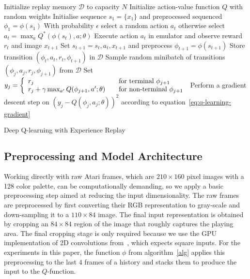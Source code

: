\documentclass{article} \usepackage{nips13submit_e,times}
\begin{document}
\begin{algorithm}[t]
\begin{algorithmic}
\State Initialize replay memory $\mathcal{D}$ to capacity $N$
\State Initialize action-value function $Q$ with random weights
\State Initialise sequence $s_1 = \{x_1\}$ and preprocessed sequenced $\phi_1 = \phi(s_1)$
	\State With probability $\epsilon$ select a random action $a_t$
	\State otherwise select $a_t = \max_{a} Q^*(\phi(s_t), a; \theta)$
	\State Execute action $a_t$ in emulator and observe reward $r_t$ and image $x_{t+1}$
	\State Set $s_{t+1} = s_t,a_t,x_{t+1}$ and preprocess $\phi_{t+1} = \phi(s_{t+1})$
	\State Store transition $\left(\phi_t,a_t,r_t,\phi_{t+1}\right)$ in $\mathcal{D}$
\State Sample random minibatch of transitions $\left(\phi_j,a_j,r_j,\phi_{j+1}\right)$ from $\mathcal{D}$
	\State Set
	$y_j =
    \left\{
    \begin{array}{l l}
      r_j  \quad & \text{for terminal } \phi_{j+1}\\
      r_j + \gamma \max_{a'} Q(\phi_{j+1}, a'; \theta) \quad & \text{for non-terminal } \phi_{j+1}
    \end{array} \right.$
	\State Perform a gradient descent step on $\left(y_j - Q(\phi_j, a_j; \theta) \right)^2$ according to equation~\ref{eq:q-learning-gradient}
\EndFor
\EndFor
\end{algorithmic}
\caption{Deep Q-learning with Experience Replay}
\label{alg}
\end{algorithm}











\subsection{Preprocessing and Model Architecture}

Working directly with raw Atari frames, which are $210\times 160$ pixel images with a 128 color palette, can be computationally demanding, so we apply a basic preprocessing step aimed at reducing the input dimensionality.  The raw frames are preprocessed by first converting their RGB representation to gray-scale and down-sampling it to a $110 \times 84$ image. The final input representation is obtained by cropping an $84\times 84$ region of the image that roughly captures the playing area. The final cropping stage is only required because we use the GPU implementation of 2D convolutions from~\cite{krizhevsky-imagenet}, which expects square inputs.  For the experiments in this paper, the function $\phi$ from algorithm~\ref{alg} applies this preprocessing to the last $4$ frames of a history and stacks them to produce the input to the $Q$-function. 
\end{document}
